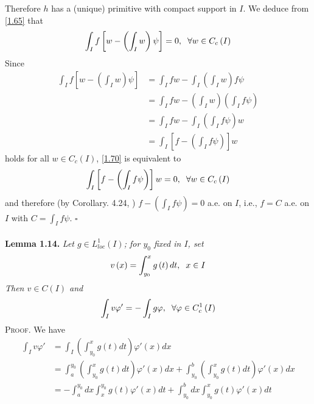 \documentclass[a4paper,oneside]{book}
\numberwithin{equation}{chapter}
\begin{document}
Therefore $h$ has a (unique) primitive with compact support in $I$. We deduce from \eqref{1.65} that
\begin{align}
\label{1.70}
\int_I {f\left[ {w - \left( {\int_I w } \right)\psi } \right]}  = 0,\hspace{0.2cm}\forall w \in {C_c}\left( I \right)
\end{align}
Since
\begin{align}
\int_I {f\left[ {w - \left( {\int_I w } \right)\psi } \right]}  &= \int_I {fw}  - \int_I {\left( {\int_I w } \right)f\psi } \\
 &= \int_I {fw}  - \left( {\int_I w } \right)\left( {\int_I {f\psi } } \right)\\
 &= \int_I {fw}  - \int_I {\left( {\int_I {f\psi } } \right)w} \\
 &= \int_I {\left[ {f - \left( {\int_I {f\psi } } \right)} \right]w} 
\end{align}
holds for all $w\in C_c\left(I\right)$, \eqref{1.70} is equivalent to
\begin{align}
\int_I {\left[ {f - \left( {\int_I {f\psi } } \right)} \right]w}  = 0,\hspace{0.2cm}\forall w \in {C_c}\left( I \right)
\end{align}
and therefore (by Corollary. 4.24, \cite{1}) ${f - \left( {\int_I {f\psi } } \right)}=0$ a.e. on $I$, i.e., $f=C$ a.e. on $I$ with $C = \int_I {f\psi } $. \hfill $\square$\\
\\
\textbf{Lemma 1.14.} \textit{Let $g \in L_{loc}^1\left( I \right)$; for $y_0$ fixed in $I$, set}
\begin{align}
v\left( x \right) = \int_{{y_0}}^x {g\left( t \right)dt} ,\hspace{0.2cm}x \in I
\end{align}
\textit{Then $v\in C\left(I\right)$ and}
\begin{align}
\label{1.77}
\int_I {v\varphi '}  =  - \int_I {g\varphi } ,\hspace{0.2cm}\forall \varphi  \in C_c^1\left( I \right)
\end{align}
\textsc{Proof.} We have
\begin{align}
\int_I {v\varphi '}  &= \int_I {\left( {\int_{{y_0}}^x {g\left( t \right)dt} } \right)\varphi '\left( x \right)dx} \\
& = \int_a^{{y_0}} {\left( {\int_{{y_0}}^x {g\left( t \right)dt} } \right)\varphi '\left( x \right)dx}  + \int_{{y_0}}^b {\left( {\int_{{y_0}}^x {g\left( t \right)dt} } \right)\varphi '\left( x \right)dx} \\
& =  - \int_a^{{y_0}} {dx\int_x^{{y_0}} {g\left( t \right)\varphi '\left( x \right)dt} }  + \int_{{y_0}}^b {dx\int_{{y_0}}^x {g\left( t \right)\varphi '\left( x \right)dt} } 
\end{align}
\end{document}
